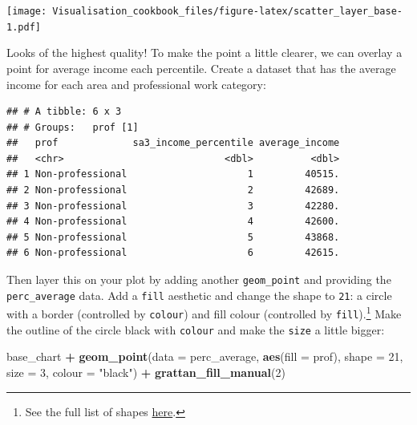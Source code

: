 \documentclass[]{book}
\newenvironment{Shaded}{\begin{snugshade}}{\end{snugshade}}
\newcommand{\DataTypeTok}[1]{\textcolor[rgb]{0.13,0.29,0.53}{#1}}
\newcommand{\DecValTok}[1]{\textcolor[rgb]{0.00,0.00,0.81}{#1}}
\newcommand{\KeywordTok}[1]{\textcolor[rgb]{0.13,0.29,0.53}{\textbf{#1}}}
\newcommand{\NormalTok}[1]{#1}
\newcommand{\OperatorTok}[1]{\textcolor[rgb]{0.81,0.36,0.00}{\textbf{#1}}}
\newcommand{\StringTok}[1]{\textcolor[rgb]{0.31,0.60,0.02}{#1}}
\begin{document}
\texttt{[image: Visualisation\_cookbook\_files/figure-latex/scatter\_layer\_base-1.pdf]}

Looks of the highest quality! To make the point a little clearer, we can overlay a point for average income each percentile. Create a dataset that has the average income for each area and professional work category:

\begin{Shaded}
\end{Shaded}

\begin{verbatim}
## # A tibble: 6 x 3
## # Groups:   prof [1]
##   prof             sa3_income_percentile average_income
##   <chr>                            <dbl>          <dbl>
## 1 Non-professional                     1         40515.
## 2 Non-professional                     2         42689.
## 3 Non-professional                     3         42280.
## 4 Non-professional                     4         42600.
## 5 Non-professional                     5         43868.
## 6 Non-professional                     6         42615.
\end{verbatim}

Then layer this on your plot by adding another \texttt{geom\_point} and providing the \texttt{perc\_average} data. Add a \texttt{fill} aesthetic and change the shape to \texttt{21}: a circle with a border (controlled by \texttt{colour}) and fill colour (controlled by \texttt{fill}).\footnote{See the full list of shapes \href{https://ggplot2.tidyverse.org/reference/scale_shape.html}{here}.}
Make the outline of the circle black with \texttt{colour} and make the \texttt{size} a little bigger:

\begin{Shaded}
\begin{Highlighting}[]
\NormalTok{base_chart }\OperatorTok{+}
\StringTok{  }\KeywordTok{geom_point}\NormalTok{(}\DataTypeTok{data =}\NormalTok{ perc_average,}
             \KeywordTok{aes}\NormalTok{(}\DataTypeTok{fill =}\NormalTok{ prof),}
             \DataTypeTok{shape =} \DecValTok{21}\NormalTok{,}
             \DataTypeTok{size =} \DecValTok{3}\NormalTok{, }
             \DataTypeTok{colour =} \StringTok{"black"}\NormalTok{) }\OperatorTok{+}\StringTok{ }
\StringTok{  }\KeywordTok{grattan_fill_manual}\NormalTok{(}\DecValTok{2}\NormalTok{)}
\end{Highlighting}
\end{Shaded}
\end{document}
